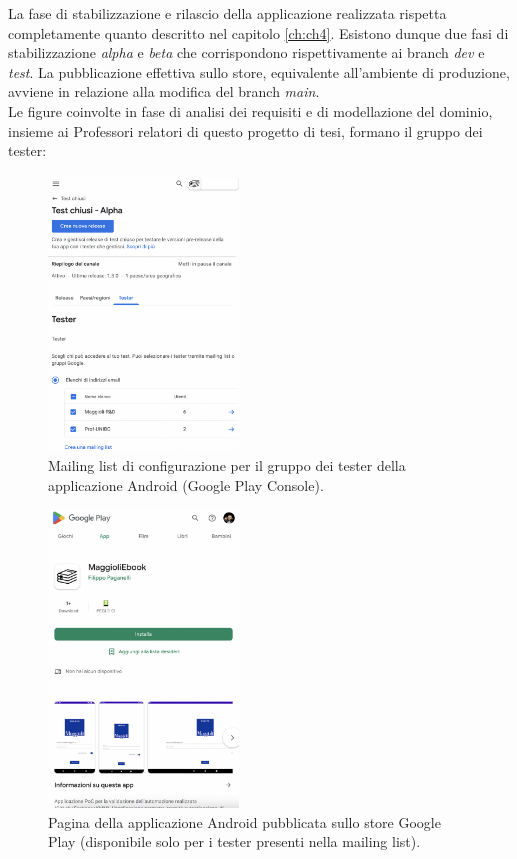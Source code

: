 La fase di stabilizzazione e rilascio della applicazione realizzata rispetta completamente quanto descritto nel capitolo \ref{ch:ch4}. Esistono dunque due fasi di stabilizzazione \textit{alpha} e \textit{beta} che corrispondono rispettivamente ai branch \textit{dev} e \textit{test}. La pubblicazione effettiva sullo store, equivalente all'ambiente di produzione, avviene in relazione alla modifica del branch \textit{main}.\\
Le figure coinvolte in fase di analisi dei requisiti e di modellazione del dominio, insieme ai Professori relatori di questo progetto di tesi, formano il gruppo dei tester:
\begin{multicols}{2}
    \begin{figure}[H]
\centering
    \includegraphics[width=0.45\textwidth]{img/Screenshot 2022-09-28 at 14.41.54.png}
    \caption{Mailing list di configurazione per il gruppo dei tester della applicazione Android (Google Play Console).}
    \label{mailinglisttester}
\end{figure}
\begin{figure}[H]
\centering
    \includegraphics[width=0.45\textwidth]{img/Screenshot 2022-09-28 at 15.06.56.png}
    \caption{Pagina della applicazione Android pubblicata sullo store Google Play (disponibile solo per i tester presenti nella mailing list).}
    \label{playstoreapp}
\end{figure}
\end{multicols}

